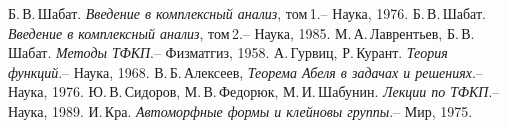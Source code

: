 \documentclass[a4paper]{article}
\begin{document}
\medskip

\begin{thebibliography}{7}
\setlength{\itemsep}{-2pt}
 Б.\,В.\,Шабат. \emph{Введение в комплексный анализ}, том\,1.-- Наука, 1976.
 Б.\,В.\,Шабат. \emph{Введение в комплексный анализ}, том\,2.-- Наука, 1985.
 М.\,А.\,Лаврентьев, Б.\,В.\,Шабат. \emph{Методы ТФКП}.-- Физматгиз, 1958.
 А.\,Гурвиц, Р.\,Курант. \emph{Теория функций}.-- Наука, 1968.
 В.\,Б.\,Алексеев, \emph{Теорема Абеля в задачах и решениях}.-- Наука, 1976.
 Ю.\,В.\,Сидоров, М.\,В.\,Федорюк, М.\,И.\,Шабунин. \emph{Лекции по ТФКП}.-- Наука, 1989.
 И.\,Кра. \emph{Автоморфные формы и клейновы группы}.-- Мир, 1975.
\end{thebibliography}

\medskip\dmvntrail
\end{document}
